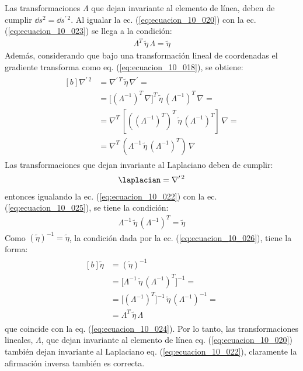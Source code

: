 Las transformaciones $\Lambda$ que dejan invariante al elemento de línea, deben de cumplir $\dd{s^{2}} = \dd{s^{\prime \, 2}}$. Al igualar la ec. (\ref{eq:ecuacion_10_020}) con la ec. (\ref{eq:ecuacion_10_023}) se llega a la condición: 
\begin{align}
\Lambda^{T} \, \tilde{\eta} \, \Lambda = \tilde{\eta}
\label{eq:ecuacion_10_024}
\end{align}
Además, considerando que bajo una transformación lineal de coordenadas el gradiente transforma como eq. (\ref{eq:ecuacion_10_018}), se obtiene:
\begin{align}
\begin{aligned}[b]
\nabla^{\prime \, 2} &= \nabla^{\prime \, T} \, \tilde{\eta} \, \nabla^{\prime} = \\[0.5em]
&= \bigg[ \left(\Lambda^{-1} \right)^{T} \, \nabla \bigg]^{T} \, \tilde{\eta} \, \left( \Lambda^{-1} \right)^{T} \, \nabla = \\[0.5em]
&= \nabla^{T} \, \left[ \left( \left( \Lambda^{-1} \right)^{T} \right)^{T} \, \tilde{\eta} \, \left( \Lambda^{-1} \right)^{T} \right] \, \nabla = \\[0.5em]
&= \nabla^{T} \, \left( \Lambda^{-1} \, \tilde{\eta} \, \left( \Lambda^{-1} \right)^{T} \right) \, \nabla
\end{aligned}
\label{eq:ecuacion_10_025}
\end{align}
Las transformaciones que dejan invariante al Laplaciano deben de cumplir:
\begin{align*}
\laplacian = \nabla^{\prime \, 2}
\end{align*}
entonces igualando la ec. (\ref{eq:ecuacion_10_022}) con la ec. (\ref{eq:ecuacion_10_025}), se tiene la condición:
\begin{align}
\Lambda^{-1} \, \tilde{\eta} \, \left( \Lambda^{-1} \right)^{T} = \tilde{\eta}
\label{eq:ecuacion_10_026}
\end{align}
Como $(\tilde{\eta})^{-1} = \tilde{\eta}$, la condición dada por la ec. (\ref{eq:ecuacion_10_026}), tiene la forma:
\begin{align}
\begin{aligned}[b]
\tilde{\eta} &= \left(\tilde{\eta} \right)^{-1} \\[0.5em]
&= \bigg[ \Lambda^{-1} \, \tilde{\eta} \, \left( \Lambda^{-1} \right)^{T} \bigg]^{-1} = \\[0.5em]
&= \bigg[ \left( \Lambda^{-1} \right)^{T} \bigg]^{-1} \, \tilde{\eta} \, \left( \Lambda^{-1} \right)^{-1} = \\[0.5em]
&= \Lambda^{T} \, \tilde{\eta} \, \Lambda
\end{aligned}
\label{eq:ecuacion_10_027}
\end{align}
que coincide con la eq. (\ref{eq:ecuacion_10_024}). Por lo tanto, las transformaciones lineales, $\Lambda$, que dejan invariante al elemento de línea eq. (\ref{eq:ecuacion_10_020}) también dejan invariante al Laplaciano eq. (\ref{eq:ecuacion_10_022}), claramente la afirmación inversa también es correcta.

